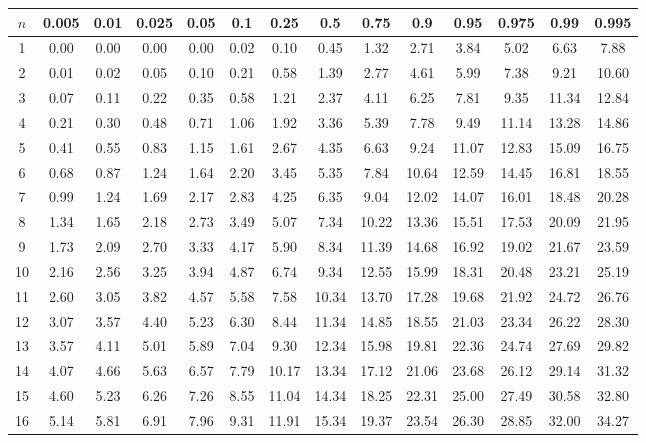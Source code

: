 \setlength{\tabcolsep}{3pt}
\renewcommand{\arraystretch}{1}
\begin{center}
\begin{tabular}{c | c c c c c c c c c c c c c}
$n$ & 0.005 & 0.01 & 0.025 & 0.05 & 0.1 & 0.25 & 0.5 & 0.75 & 0.9 & 0.95 & 0.975 & 0.99 & 0.995 \\
\hline
1 & 0.00 & 0.00 & 0.00 & 0.00 & 0.02 & 0.10 & 0.45 & 1.32 & 2.71 & 3.84 & 5.02 & 6.63 & 7.88 \\
2 & 0.01 & 0.02 & 0.05 & 0.10 & 0.21 & 0.58 & 1.39 & 2.77 & 4.61 & 5.99 & 7.38 & 9.21 & 10.60 \\
3 & 0.07 & 0.11 & 0.22 & 0.35 & 0.58 & 1.21 & 2.37 & 4.11 & 6.25 & 7.81 & 9.35 & 11.34 & 12.84 \\
4 & 0.21 & 0.30 & 0.48 & 0.71 & 1.06 & 1.92 & 3.36 & 5.39 & 7.78 & 9.49 & 11.14 & 13.28 & 14.86 \\
5 & 0.41 & 0.55 & 0.83 & 1.15 & 1.61 & 2.67 & 4.35 & 6.63 & 9.24 & 11.07 & 12.83 & 15.09 & 16.75 \\
6 & 0.68 & 0.87 & 1.24 & 1.64 & 2.20 & 3.45 & 5.35 & 7.84 & 10.64 & 12.59 & 14.45 & 16.81 & 18.55 \\
7 & 0.99 & 1.24 & 1.69 & 2.17 & 2.83 & 4.25 & 6.35 & 9.04 & 12.02 & 14.07 & 16.01 & 18.48 & 20.28 \\
8 & 1.34 & 1.65 & 2.18 & 2.73 & 3.49 & 5.07 & 7.34 & 10.22 & 13.36 & 15.51 & 17.53 & 20.09 & 21.95 \\
9 & 1.73 & 2.09 & 2.70 & 3.33 & 4.17 & 5.90 & 8.34 & 11.39 & 14.68 & 16.92 & 19.02 & 21.67 & 23.59 \\
10 & 2.16 & 2.56 & 3.25 & 3.94 & 4.87 & 6.74 & 9.34 & 12.55 & 15.99 & 18.31 & 20.48 & 23.21 & 25.19 \\
11 & 2.60 & 3.05 & 3.82 & 4.57 & 5.58 & 7.58 & 10.34 & 13.70 & 17.28 & 19.68 & 21.92 & 24.72 & 26.76 \\
12 & 3.07 & 3.57 & 4.40 & 5.23 & 6.30 & 8.44 & 11.34 & 14.85 & 18.55 & 21.03 & 23.34 & 26.22 & 28.30 \\
13 & 3.57 & 4.11 & 5.01 & 5.89 & 7.04 & 9.30 & 12.34 & 15.98 & 19.81 & 22.36 & 24.74 & 27.69 & 29.82 \\
14 & 4.07 & 4.66 & 5.63 & 6.57 & 7.79 & 10.17 & 13.34 & 17.12 & 21.06 & 23.68 & 26.12 & 29.14 & 31.32 \\
15 & 4.60 & 5.23 & 6.26 & 7.26 & 8.55 & 11.04 & 14.34 & 18.25 & 22.31 & 25.00 & 27.49 & 30.58 & 32.80 \\
16 & 5.14 & 5.81 & 6.91 & 7.96 & 9.31 & 11.91 & 15.34 & 19.37 & 23.54 & 26.30 & 28.85 & 32.00 & 34.27 \\

\end{tabular}
\end{center}
